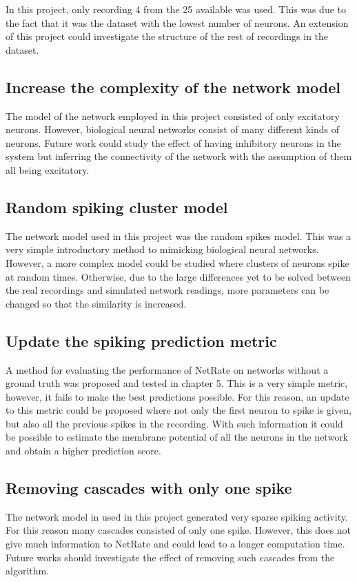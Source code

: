 In this project, only recording 4 from the 25 available was used. This was due to the fact that it was the dataset with the lowest number of neurons. An extension of this project could investigate the structure of the rest of recordings in the dataset. 

\subsection{Increase the complexity of the network model}

The model of the network employed in this project consisted of only excitatory neurons. However, biological neural networks consist of many different kinds of neurons. Future work could study the effect of having inhibitory neurons in the system but inferring the connectivity of the network with the assumption of them all being excitatory. 

\subsection{Random spiking cluster model}

The network model used in this project was the random spikes model. This was a very simple introductory method to mimicking biological neural networks. However, a more complex model could be studied where clusters of neurons spike at random times. Otherwise, due to the large differences yet to be solved between the real recordings and simulated network readings, more parameters can be changed so that the similarity is increased.

\subsection{Update the spiking prediction metric}

A method for evaluating the performance of NetRate on networks without a ground truth was proposed and tested in chapter 5. This is a very simple metric, however, it fails to make the best predictions possible. For this reason, an update to this metric could be proposed where not only the first neuron to spike is given, but also all the previous spikes in the recording. With such information it could be possible to estimate the membrane potential of all the neurons in the network and obtain a higher prediction score.

\subsection{Removing cascades with only one spike}

The network model in used in this project generated very sparse spiking activity. For this reason many cascades consisted of only one spike. However, this does not give much information to NetRate and could lead to a longer computation time. Future works should investigate the effect of removing such cascades from the algorithm. 

